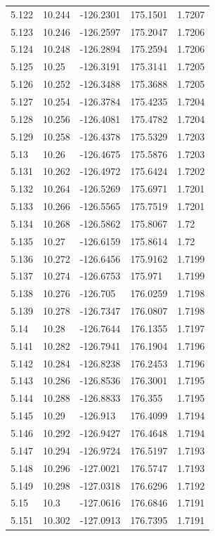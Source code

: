 \begin{tabular}{lllll}
5.122 & 10.244 & -126.2301 & 175.1501 & 1.7207 \\
5.123 & 10.246 & -126.2597 & 175.2047 & 1.7206 \\
5.124 & 10.248 & -126.2894 & 175.2594 & 1.7206 \\
5.125 & 10.25 & -126.3191 & 175.3141 & 1.7205 \\
5.126 & 10.252 & -126.3488 & 175.3688 & 1.7205 \\
5.127 & 10.254 & -126.3784 & 175.4235 & 1.7204 \\
5.128 & 10.256 & -126.4081 & 175.4782 & 1.7204 \\
5.129 & 10.258 & -126.4378 & 175.5329 & 1.7203 \\
5.13 & 10.26 & -126.4675 & 175.5876 & 1.7203 \\
5.131 & 10.262 & -126.4972 & 175.6424 & 1.7202 \\
5.132 & 10.264 & -126.5269 & 175.6971 & 1.7201 \\
5.133 & 10.266 & -126.5565 & 175.7519 & 1.7201 \\
5.134 & 10.268 & -126.5862 & 175.8067 & 1.72 \\
5.135 & 10.27 & -126.6159 & 175.8614 & 1.72 \\
5.136 & 10.272 & -126.6456 & 175.9162 & 1.7199 \\
5.137 & 10.274 & -126.6753 & 175.971 & 1.7199 \\
5.138 & 10.276 & -126.705 & 176.0259 & 1.7198 \\
5.139 & 10.278 & -126.7347 & 176.0807 & 1.7198 \\
5.14 & 10.28 & -126.7644 & 176.1355 & 1.7197 \\
5.141 & 10.282 & -126.7941 & 176.1904 & 1.7196 \\
5.142 & 10.284 & -126.8238 & 176.2453 & 1.7196 \\
5.143 & 10.286 & -126.8536 & 176.3001 & 1.7195 \\
5.144 & 10.288 & -126.8833 & 176.355 & 1.7195 \\
5.145 & 10.29 & -126.913 & 176.4099 & 1.7194 \\
5.146 & 10.292 & -126.9427 & 176.4648 & 1.7194 \\
5.147 & 10.294 & -126.9724 & 176.5197 & 1.7193 \\
5.148 & 10.296 & -127.0021 & 176.5747 & 1.7193 \\
5.149 & 10.298 & -127.0318 & 176.6296 & 1.7192 \\
5.15 & 10.3 & -127.0616 & 176.6846 & 1.7191 \\
5.151 & 10.302 & -127.0913 & 176.7395 & 1.7191 \\

\end{tabular}

